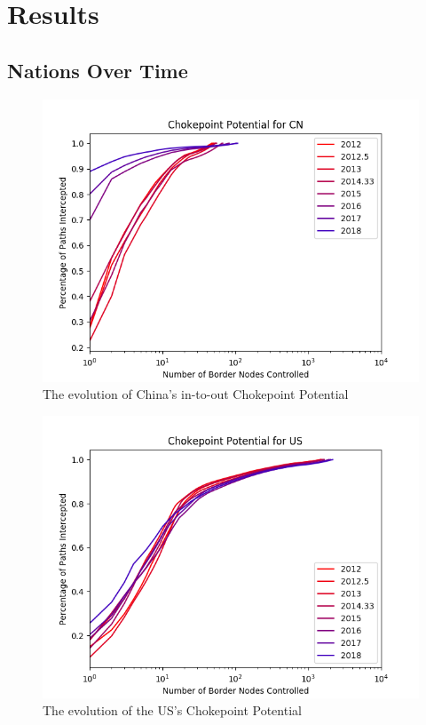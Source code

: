 \documentclass[10pt, conference, letterpaper]{IEEEtran}
\begin{document}
\section{Results}
\subsection{Nations Over Time}

\begin{figure}
	\centering
	\includegraphics[width=\linewidth]{single_CN}
	\caption{The evolution of China's in-to-out Chokepoint Potential}\label{fig:ChinaChokePoint}
\end{figure}

\begin{figure}
	\centering
	\includegraphics[width=\linewidth]{single_US}
	\caption{The evolution of the US's Chokepoint Potential}\label{fig:USChokePoint}
\end{figure}
\end{document}
